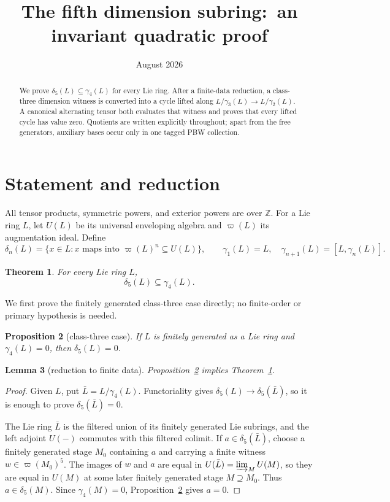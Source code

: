 \documentclass[11pt]{amsart}
\title[The fifth dimension subring]{The fifth dimension subring:\
an invariant quadratic proof}
\author{}
\date{August 2026}
\newtheorem{theorem}{Theorem}[section]
\newtheorem{proposition}[theorem]{Proposition}
\newtheorem{lemma}[theorem]{Lemma}
\newcommand{\Z}{\mathbb Z}
\newcommand{\gm}{\gamma}
\newcommand{\dlt}{\delta}
\newcommand{\aug}{\varpi}
\begin{document}
\begin{abstract}
We prove $\delta _5(L)\subseteq\gamma _4(L)$ for every Lie ring.
After a finite-data reduction, a class-three dimension witness is
converted into a cycle lifted along
$L/\gamma _3(L)\to L/\gamma _2(L)$.  A canonical alternating tensor
both evaluates that witness and proves that every lifted cycle has
value zero.  Quotients are written explicitly throughout; apart from
the free generators, auxiliary bases occur only in one tagged PBW
collection.
\end{abstract}

\maketitle

\section{Statement and reduction}

All tensor products, symmetric powers, and exterior powers are over
$\Z$.  For a Lie ring $L$, let $U(L)$ be its universal enveloping
algebra and $\aug(L)$ its augmentation ideal.  Define
\[
 \dlt_n(L)=\{x\in L: x\text{ maps into }\aug(L)^n\subseteq U(L)\},
 \qquad
 \gm_1(L)=L,\quad \gm_{n+1}(L)=[L,\gm_n(L)].
\]

\begin{theorem}\label{thm:main}
For every Lie ring $L$,
\[
                         \dlt_5(L)\subseteq\gm_4(L).
\]
\end{theorem}

We first prove the finitely generated class-three case directly; no
finite-order or primary hypothesis is needed.

\begin{proposition}[class-three case]\label{prop:class-three}
If $L$ is finitely generated as a Lie ring and $\gm_4(L)=0$, then
$\dlt_5(L)=0$.
\end{proposition}

\begin{lemma}[reduction to finite data]\label{lem:reduction}
Proposition~\ref{prop:class-three} implies
Theorem~\ref{thm:main}.
\end{lemma}

\begin{proof}
Given $L$, put $\bar L=L/\gm_4(L)$.  Functoriality gives
$\dlt_5(L)\to\dlt_5(\bar L)$, so it is enough to prove
$\dlt_5(\bar L)=0$.

The Lie ring $\bar L$ is the filtered union of its finitely generated
Lie subrings, and the left adjoint $U(-)$ commutes with this filtered
colimit.  If $a\in\dlt_5(\bar L)$, choose a finitely generated stage
$M_0$ containing $a$ and carrying a finite witness
$w\in\aug(M_0)^5$.  The images of $w$ and $a$ are equal in
$U(\bar L)=\varinjlim_MU(M)$, so they are equal in $U(M)$ at some
later finitely generated stage $M\supseteq M_0$.  Thus
$a\in\dlt_5(M)$.  Since $\gm_4(M)=0$,
Proposition~\ref{prop:class-three} gives $a=0$.
\end{proof}
\end{document}
